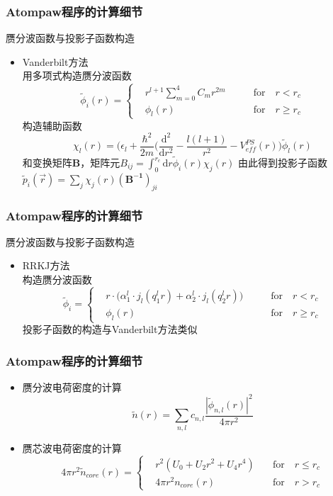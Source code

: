 \documentclass[cjk,slidestop,compress,mathserif,blue]{beamer}
\begin{document}
\frame
{
	\frametitle{\textrm{Atompaw}程序的计算细节}
	赝分波函数与投影子函数构造
	\begin{itemize}
		\item \textrm{Vanderbilt}方法\\
			用多项式构造赝分波函数
	\begin{displaymath}
		\tilde\phi_i(r)=\left\{
			\begin{aligned}
				&r^{l+1}\sum_{m=0}^4C_mr^{2m}\qquad &\mathrm{for}\quad r<r_c \\
				&\phi_l(r)\qquad &\mathrm{for}\quad r\geqslant r_c
			\end{aligned}
			\right.
	\end{displaymath}
	构造辅助函数
	$$\chi_l(r)=\bigg(\epsilon_l+\dfrac{\hbar^2}{2m}(\dfrac{\mathrm{d}^2}{\mathrm{d}r^2}-\dfrac{l(l+1)}{r^2}-V_{eff}^{PS}(r)\bigg)\tilde\phi_l(r)$$
	和变换矩阵\textbf{B}，矩阵元$B_{ij}=\int_0^{r_c}\mathrm{d}r\tilde\phi_i(r)\chi_j(r)$
	由此得到投影子函数$\tilde p_i(\vec r)=\sum_{j}\chi_j(r)(\mathbf{B^{-1}})_{ji}$
	\end{itemize}
}


\frame
{
	\frametitle{\textrm{Atompaw}程序的计算细节}
	赝分波函数与投影子函数构造
	\begin{itemize}
		\item \textrm{RRKJ}方法\\
		构造赝分波函数
	\begin{displaymath}
		\tilde\phi_i=\left\{
			\begin{aligned}
				&r\cdot\bigg(\alpha_1^l\cdot j_l(q_1^lr)+\alpha_2^l\cdot j_l(q_2^lr)\bigg) \qquad &\mathrm{for}\quad r<r_c \\
				&\phi_l(r)\qquad &\mathrm{for}\quad r\geqslant r_c
			\end{aligned}
			\right.
	\end{displaymath}
	投影子函数的构造与\textrm{Vanderbilt}方法类似
	\end{itemize}
}


\frame
{
	\frametitle{\textrm{Atompaw}程序的计算细节}
	\begin{itemize}
		\item 赝分波电荷密度的计算
	$$\tilde n(r)=\sum_{n,l}c_{n,l}\dfrac{|\tilde\phi_{n,l}(r)|^2}{4\pi r^2}$$
		\item 赝芯波电荷密度的计算
	\begin{displaymath}
		4\pi r^2\tilde n_{core}(r)=\left\{
			\begin{aligned}
				&r^2(U_0+U_2r^2+U_4r^4)\quad &\mathrm{for}\quad r\leqslant r_c \\
				&4\pi r^2n_{core}(r)\quad &\mathrm{for}\quad r>r_c
			\end{aligned}
			\right.
	\end{displaymath}
	\end{itemize}
}
\end{document}
